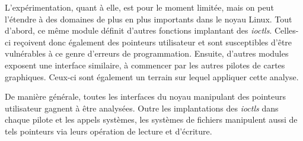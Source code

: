 L'expérimentation, quant à elle, est pour le moment limitée, mais on peut
l'étendre à des domaines de plus en plus importants dans le noyau Linux. Tout
d'abord, ce même module définit d'autres fonctions implantant des \emph{ioctls}.
Celles-ci reçoivent donc également des pointeurs utilisateur et sont
susceptibles d'être vulnérables à ce genre d'erreurs de programmation. Ensuite,
d'autres modules exposent une interface similaire, à commencer par les autres
pilotes de cartes graphiques. Ceux-ci sont également un terrain sur lequel
appliquer cette analyse.

De manière générale, toutes les interfaces du noyau manipulant des pointeurs
utilisateur gagnent à être analysées. Outre les implantations des \emph{ioctls}
dans chaque pilote et les appels systèmes, les systèmes de fichiers manipulent
aussi de tels pointeurs via leurs opération de lecture et d'écriture.

